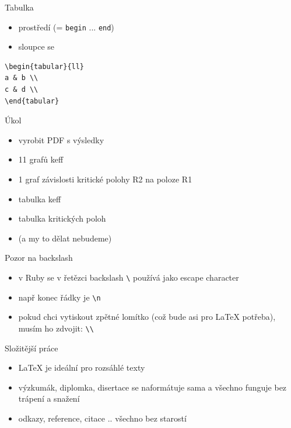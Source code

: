 \documentclass{beamer}
\begin{document}
\begin{frame}[fragile]{Tabulka}
  \begin{itemize}
    \item prostředí (= \texttt{begin} ... \texttt{end})
    \item sloupce se
  \end{itemize}
      \scriptsize
  \begin{verbatim}
\begin{tabular}{ll}
a & b \\
c & d \\
\end{tabular}
  \end{verbatim}

\end{frame}

\begin{frame}{Úkol}
  \begin{itemize}
    \item vyrobit PDF s výsledky
    \item 11 grafů keff
    \item 1 graf závislosti kritické polohy R2 na poloze R1
    \item tabulka keff
    \item tabulka kritických poloh
    \item (a my to dělat nebudeme)
  \end{itemize}
\end{frame}

\begin{frame}{Pozor na backslash}
  \begin{itemize}
    \item v Ruby se v řetězci backslash \texttt{\textbackslash} používá jako escape character
    \item např konec řádky je \texttt{\textbackslash n}
    \item pokud chci vytiskout zpětné lomítko (což bude asi pro LaTeX potřeba), musím ho zdvojit: \texttt{\textbackslash \textbackslash}
  \end{itemize}
\end{frame}

\begin{frame}{Složitější práce}
  \begin{itemize}
    \item LaTeX je ideální pro rozsáhlé texty
    \item výzkumák, diplomka, disertace se naformátuje sama a všechno funguje bez trápení a snažení
    \item odkazy, reference, citace .. všechno bez starostí
  \end{itemize}
\end{frame}
\end{document}
